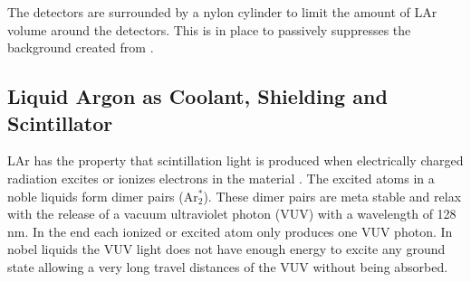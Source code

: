 \documentclass[encoding=utf8,british]{tumphthesis}
\begin{document}
The detectors are surrounded by a nylon cylinder to limit the amount of LAr volume around the detectors.
This is in place to passively suppresses the background created from .

\subsection{Liquid Argon as Coolant, Shielding and Scintillator} 
\label{sec:LArcoolant}

LAr has the property that scintillation light is produced when electrically charged radiation excites or ionizes electrons in the material \cite{olsen_improvements_nodate}.
The excited atoms in a noble liquids form dimer pairs (Ar$^*_2$).
These dimer pairs are meta stable and relax with the release of a vacuum ultraviolet photon (VUV) with a wavelength of 128 nm.
In the end each ionized or excited atom only produces one VUV photon.
In nobel liquids the VUV light does not have enough energy to excite any ground state allowing a very long travel distances of the VUV without being absorbed.
\\
\end{document}
